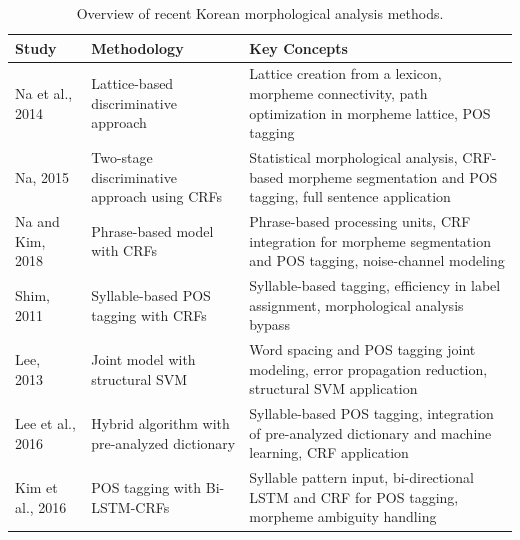 \documentclass[AMS,STIX2COL]{WileyNJD-v2}
\begin{document}
    \begin{table}[ht]
        \centering
        \footnotesize %
        \caption{Overview of recent Korean morphological analysis methods.}
        \label{tab:overview-of-recent-korean-morphological-analysis-methods}
        \begin{tabular}{|p{10mm}|p{24mm}|p{40mm}|}
            \hline
            \textbf{Study}                        & \textbf{Methodology}                                   & \textbf{Key Concepts}                                                                                            \\
            \hline
            Na et al., 2014~\cite{NaSH2014}       & Lattice-based discriminative approach                  & Lattice creation from a lexicon, morpheme connectivity, path optimization in morpheme lattice, POS tagging       \\
            \hline
            Na, 2015~\cite{NaSH2015}              & Two-stage discriminative approach using CRFs           & Statistical morphological analysis, CRF-based morpheme segmentation and POS tagging, full sentence application   \\
            \hline
            Na and Kim, 2018~\cite{NaSH2018}      & Phrase-based model with CRFs                           & Phrase-based processing units, CRF integration for morpheme segmentation and POS tagging, noise-channel modeling \\
            \hline
            Shim, 2011~\cite{ShimKS2011}          & Syllable-based POS tagging with CRFs                   & Syllable-based tagging, efficiency in label assignment, morphological analysis bypass                            \\
            \hline
            Lee, 2013~\cite{LeeCK2013}            & Joint model with structural SVM                        & Word spacing and POS tagging joint modeling, error propagation reduction, structural SVM application             \\
            \hline
            Lee et al., 2016~\cite{LeeCH2016}     & Hybrid algorithm with pre-analyzed dictionary          & Syllable-based POS tagging, integration of pre-analyzed dictionary and machine learning, CRF application         \\
            \hline
            Kim et al., 2016~\cite{KimHM2016}     & POS tagging with Bi-LSTM-CRFs                          & Syllable pattern input, bi-directional LSTM and CRF for POS tagging, morpheme ambiguity handling                 \\

\end{tabular}
\end{table}
\end{document}
